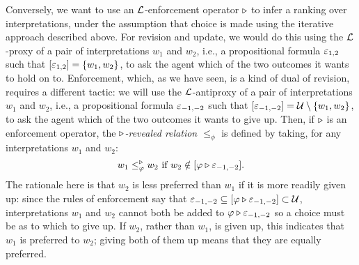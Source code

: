 Conversely, we want to use an $\mathcal{L}$-enforcement operator $\triangleright$
to infer a ranking over interpretations,
under the assumption that choice is made using the iterative approach
described above.
For revision and update, we would do this using the $\mathcal{L}$-proxy 
of a pair of interpretations $w_1$ and $w_2$, 
i.e., a propositional formula $\varepsilon_{1,2}$
such that $[\varepsilon_{1,2}]=\{w_1,w_2\}$,
to ask the agent which of the two outcomes it 
wants to hold on to.
Enforcement, which, as we have seen, 
is a kind of dual of revision,
requires a different tactic: 
we will use the $\mathcal{L}$-antiproxy
of a pair of interpretations $w_1$ and $w_2$,
i.e., a propositional formula 
$\varepsilon_{-1,-2}$ such that $[\varepsilon_{-1,-2}]=\mathcal{U}\setminus\{w_1,w_2\}$,
to ask the agent which of the two outcomes it wants to
give up.
Then, 
if $\triangleright$ is an enforcement operator,
the \emph{$\triangleright$-revealed relation $\le_\phi$} is defined by taking,
for any interpretations $w_1$ and $w_2$:
$$
	w_1\le^{\triangleright}_\varphi w_2~\text{if}~w_2\notin[\varphi\triangleright\varepsilon_{-1,-2}].
$$
The rationale here is that $w_2$ is 
less preferred than $w_1$ if it is more readily given up:
since the rules of enforcement say that 
${\varepsilon_{-1,-2}}\subseteq [\varphi\triangleright \varepsilon_{-1,-2}]\subset\mathcal{U}$,
interpretations $w_1$ and $w_2$ cannot both 
be added to $\varphi \triangleright \varepsilon_{-1,-2}$
so a choice must be as to which to give up.
If $w_2$, rather than $w_1$, is given up, this indicates that
$w_1$ is preferred to $w_2$; giving both of them up means that
they are equally preferred. 

